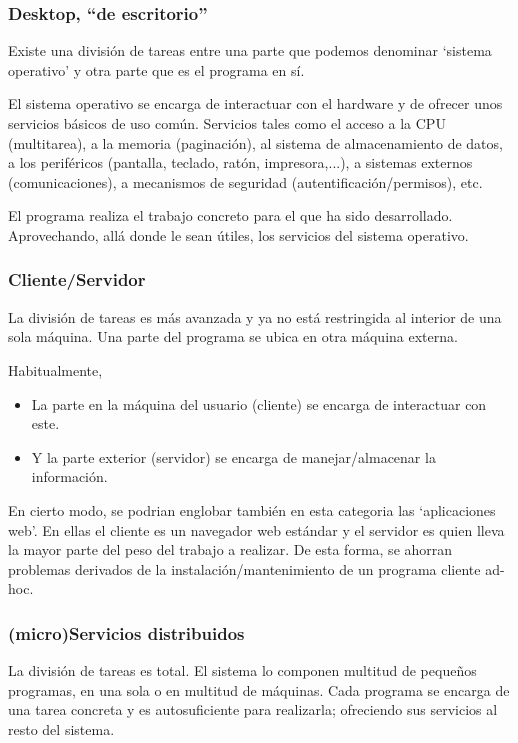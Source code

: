\documentclass[spanish,12pt,a4paper,final,oneside]{book}
\begin{document}
\subsubsection{Desktop, ``de escritorio''}
Existe una división de tareas entre una parte que podemos denominar `sistema operativo' y otra parte que es el programa en sí.

El sistema operativo se encarga de interactuar con el hardware y de ofrecer unos servicios básicos de uso común. Servicios tales como el acceso a la CPU (multitarea), a la memoria (paginación), al sistema de almacenamiento de datos, a los periféricos (pantalla, teclado, ratón, impresora,...), a sistemas externos (comunicaciones), a mecanismos de seguridad (autentificación/permisos), etc.

El programa realiza el trabajo concreto para el que ha sido desarrollado. Aprovechando, allá donde le sean útiles, los servicios del sistema operativo.

\subsubsection{Cliente/Servidor}
La división de tareas es más avanzada y ya no está restringida al interior de una sola máquina. Una parte del programa se ubica en otra máquina externa.

Habitualmente, 
\begin{itemize}
\item La parte en la máquina del usuario (cliente) se encarga de interactuar con este. 
\item Y la parte exterior (servidor) se encarga de manejar/almacenar la información.
\end{itemize}

En cierto modo, se podrian englobar también en esta categoria las `aplicaciones web'. En ellas el cliente es un navegador web estándar y el servidor es quien lleva la mayor parte del peso del trabajo a realizar. De esta forma, se ahorran problemas derivados de la instalación/mantenimiento de un programa cliente ad-hoc.

\subsubsection{(micro)Servicios distribuidos}
La división de tareas es total. El sistema lo componen multitud de pequeños programas, en una sola o en multitud de máquinas. Cada programa se encarga de una tarea concreta y es autosuficiente para realizarla; ofreciendo sus servicios al resto del sistema.
\end{document}
